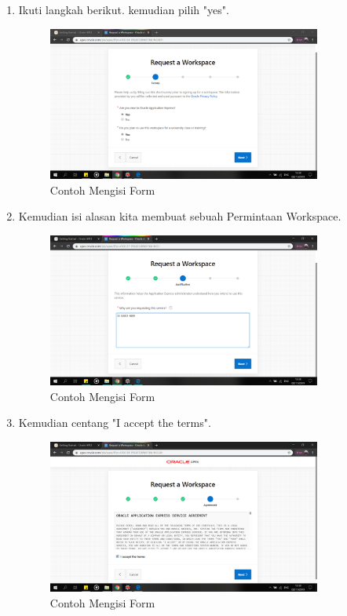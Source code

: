 \begin{enumerate}
\item Ikuti langkah berikut. kemudian pilih "yes".
    \begin{figure}[!htbp]
    \centering
    \includegraphics[width=9cm]{picture/07.png}
    \caption{Contoh Mengisi Form}
    \end{figure}
    
\item Kemudian isi alasan kita membuat sebuah Permintaan Workspace.
    \begin{figure}[!htbp]
    \centering
    \includegraphics[width=9cm]{picture/08.png}
    \caption{Contoh Mengisi Form}
    \end{figure}
    
\newpage
\item Kemudian centang "I accept the terms".
    \begin{figure}[!htbp]
    \centering
    \includegraphics[width=9cm]{picture/09.png}
    \caption{Contoh Mengisi Form}
    \end{figure}
    

\end{enumerate}
